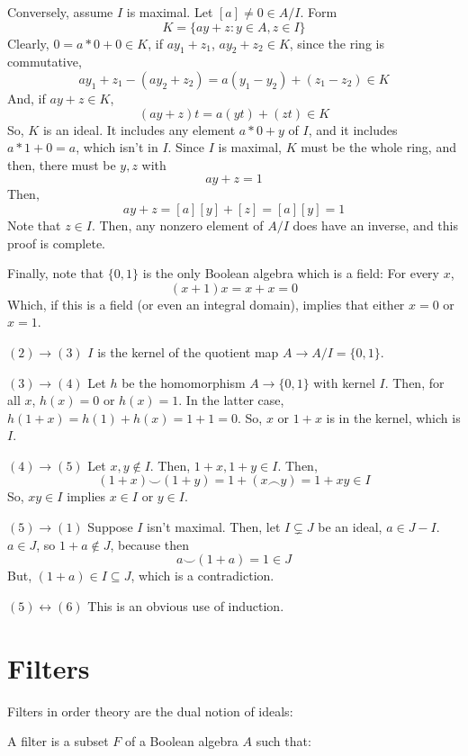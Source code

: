 \documentclass{article}
\begin{document}
      Conversely, assume $I$ is maximal. Let $[a] \neq 0 \in A/I$. Form
      \[K = \{ay + z: y \in A, z \in I\} \]
      Clearly, $0 = a*0 + 0 \in K$, if $ay_1 + z_1$, $ay_2 + z_2 \in K$, since
      the ring is commutative,
      \[ay_1 + z_1 -(ay_2 + z_2) = a(y_1-y_2) + (z_1 - z_2) \in K\]
      And, if $ay + z \in K$,
      \[(ay + z)t = a(yt) + (zt) \in K\]
      So, $K$ is an ideal. It includes any element $a*0 + y$ of $I$, and it
      includes $a*1 + 0 = a$, which isn't in $I$. Since $I$ is maximal, $K$ must
      be the whole ring, and then, there must be $y, z$ with
      \[ay + z = 1\]
      Then,
      \[ay + z= [a][y] + [z] = [a][y] = 1\]
      Note that $z \in I$. Then, any nonzero element of $A/I$ does have an
      inverse, and this proof is complete.

      Finally, note that $\{0,1\}$ is the only Boolean algebra which is a field:
      For every $x$,
      \[(x+1)x = x + x = 0\]
      Which, if this is a field (or even an integral domain), implies that
      either $x=0$ or $x=1$.

      $(2) \rightarrow (3)$ $I$ is the kernel of the quotient map $A \rightarrow
      A/I = \{0,1\}$.

      $(3) \rightarrow (4)$ Let $h$ be the homomorphism $A \rightarrow \{0,1\}$
      with kernel $I$. Then, for all $x$, $h(x) = 0$ or $h(x) = 1$. In the
      latter case, $h(1+x) = h(1) + h(x) = 1 + 1 = 0$. So, $x$ or $1+x$ is in
      the kernel, which is $I$.

      $(4) \rightarrow (5)$ Let $x, y \notin I$. Then, $1+x, 1+y \in I$. Then,
      \[(1+x) \smile (1+y) = 1 + (x \frown y) = 1 + xy \in I\]
      So, $xy \in I$ implies $x \in I$ or $y \in I$.

      $(5) \rightarrow (1)$ Suppose $I$ isn't maximal. Then, let $I \subsetneq
      J$ be an ideal, $a \in J - I$. $a \in J$, so $1+a \notin J$, because then
      \[a \smile (1+a) = 1 \in J\]
      But, $(1+a) \in I \subseteq J$, which is a contradiction.

      $(5) \leftrightarrow (6)$ This is an obvious use of induction.

    \section{Filters}

      Filters in order theory are the dual notion of ideals:

      A filter is a subset $F$ of a Boolean algebra $A$ such that:
\end{document}
